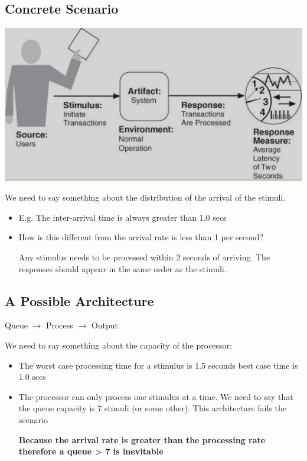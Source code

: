 \documentclass[a4paper]{article}
\begin{document}
\subsection{Concrete Scenario}
\begin{center}
\includegraphics[scale=0.6]{images/sad.png}
\end{center}

We need to say something about the distribution of the arrival of the stimuli.
\begin{itemize}
\item{E.g. The inter-arrival time is always greater than 1.0 secs}
\item{How is this different from the arrival rate is less than 1 per second?}

Any stimulus needs to be processed within 2 seconds of arriving.
The responses should appear in the same order as the stimuli.
\end{itemize}

\subsection{A Possible Architecture}

Queue $\rightarrow$ Process $\rightarrow$ Output

We need to say something about the capacity of the processor:
\begin{itemize}
\item{The worst case processing time for a stimulus is 1.5 seconds best case time is 1.0 secs}
\item{The processor can only process one stimulus at a time.}
We need to say that the queue capacity is 7 stimuli (or some other).
This architecture fails the scenario 

\textbf{Because the arrival rate is greater than the processing rate therefore a queue > 7 is inevitable}
\end{itemize}
\end{document}
